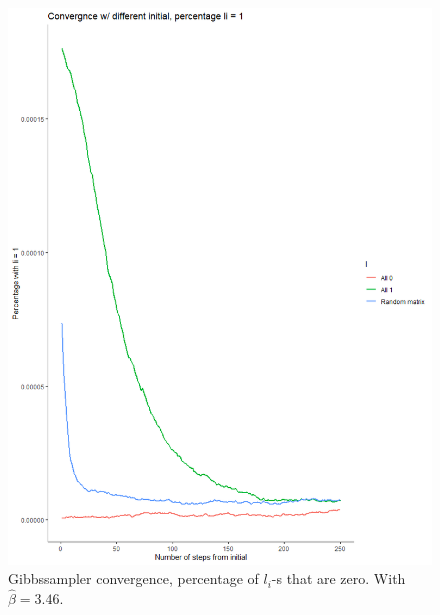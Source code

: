 \documentclass{article}
\begin{document}
\begin{figure}[h]	
	\begin{center} 
		\includegraphics[scale=0.48]{plotc1.png}
	\end{center}
	\caption{Gibbssampler convergence, percentage of $l_i$-s that are zero. With $\hat \beta = 3.46$. }
	\label{fig:c1} 
\end{figure}
\end{document}
